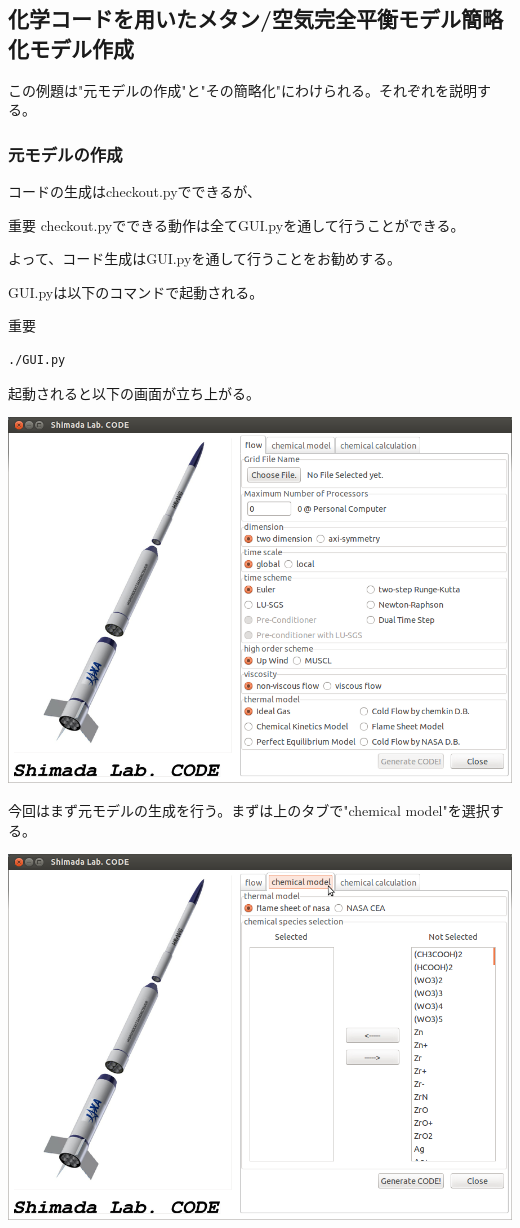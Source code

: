 \documentclass{jsarticle}
\begin{document}
\subsection{化学コードを用いたメタン/空気完全平衡モデル簡略化モデル作成}%
この例題は"元モデルの作成"と"その簡略化"にわけられる。それぞれを説明する。
\subsubsection{元モデルの作成}
コードの生成はcheckout.pyでできるが、
\begin{itembox}[l]{重要}
checkout.pyでできる動作は全てGUI.pyを通して行うことができる。
\end{itembox}
よって、コード生成はGUI.pyを通して行うことをお勧めする。

GUI.pyは以下のコマンドで起動される。
\begin{itembox}[l]{重要}
\begin{verbatim}
./GUI.py
\end{verbatim}
\end{itembox}
起動されると以下の画面が立ち上がる。
\begin{center}
\includegraphics[width=.7\textwidth,bb=0 0 895 649]{tutorial_img/010.png}
\end{center}
今回はまず元モデルの生成を行う。まずは上のタブで"chemical model"を選択する。
\begin{center}
\includegraphics[width=.7\textwidth,bb=0 0 895 649]{tutorial_img/020.png}
\end{center}
\end{document}
